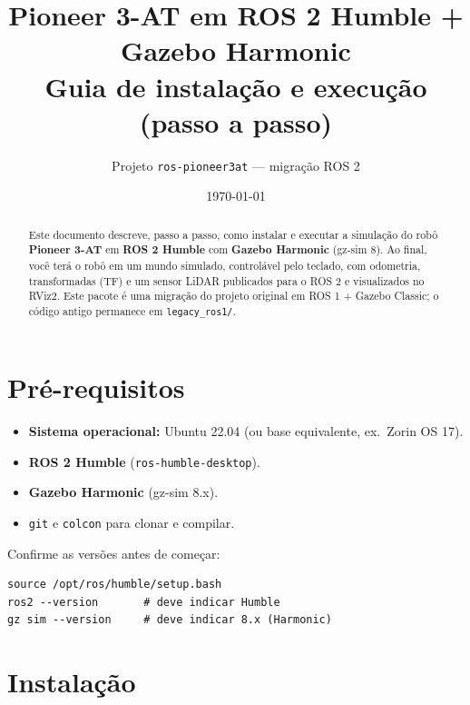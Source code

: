 \documentclass[11pt,a4paper]{article}
\title{\textbf{Pioneer 3-AT em ROS 2 Humble + Gazebo Harmonic}\\[0.3em]
\large Guia de instalação e execução (passo a passo)}
\author{Projeto \texttt{ros-pioneer3at} --- migração ROS 2}
\date{\today}
\begin{document}
\maketitle
\thispagestyle{fancy}

\begin{abstract}
\noindent
Este documento descreve, passo a passo, como instalar e executar a simulação do
robô \textbf{Pioneer 3-AT} em \textbf{ROS 2 Humble} com \textbf{Gazebo Harmonic}
(gz-sim 8). Ao final, você terá o robô em um mundo simulado, controlável pelo
teclado, com odometria, transformadas (TF) e um sensor LiDAR publicados para o
ROS 2 e visualizados no RViz2. Este pacote é uma migração do projeto original em
ROS 1 + Gazebo Classic; o código antigo permanece em \texttt{legacy\_ros1/}.
\end{abstract}

\tableofcontents
\vspace{1em}

\section{Pré-requisitos}

\begin{itemize}
  \item \textbf{Sistema operacional:} Ubuntu 22.04 (ou base equivalente, ex.\ Zorin OS 17).
  \item \textbf{ROS 2 Humble} (\texttt{ros-humble-desktop}).
  \item \textbf{Gazebo Harmonic} (gz-sim 8.x).
  \item \texttt{git} e \texttt{colcon} para clonar e compilar.
\end{itemize}

\noindent
Confirme as versões antes de começar:

\begin{lstlisting}
source /opt/ros/humble/setup.bash
ros2 --version       # deve indicar Humble
gz sim --version     # deve indicar 8.x (Harmonic)
\end{lstlisting}

\section{Instalação}
\end{document}
